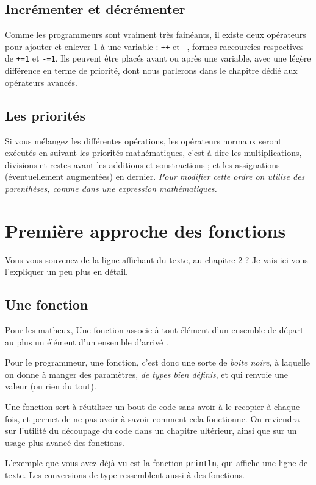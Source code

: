 \subsection{Incrémenter et décrémenter}
Comme les programmeurs sont vraiment très fainéants, il existe deux opérateurs pour ajouter et enlever 1 à une variable : \texttt{++} et \texttt{--}, formes raccourcies respectives de \texttt{+=1} et \texttt{-=1}. Ils peuvent être placés avant ou après une variable, avec une légère différence en terme de priorité, dont nous parlerons dans le chapitre dédié aux opérateurs avancés.

\subsection{Les priorités}
Si vous mélangez les différentes opérations, les opérateurs normaux seront exécutés en suivant les priorités mathématiques, c'est-à-dire les multiplications, divisions et restes avant les additions et soustractions ; et les assignations (éventuellement augmentées) en dernier.
\emph{Pour modifier cette ordre on utilise des parenthèses, comme dans une expression mathématiques.}

\pagebreak
\section{Première approche des fonctions}
Vous vous souvenez de la ligne affichant du texte, au chapitre 2 ? Je vais ici vous l'expliquer un peu plus en détail.

\subsection{Une fonction}
Pour les matheux, \og Une fonction associe à tout élément d'un ensemble de départ au plus un élément d'un ensemble d'arrivé \fg{}.

Pour le programmeur, une fonction, c'est donc une sorte de \emph{boite noire}, à laquelle on donne à manger des paramètres, \emph{de types bien définis}, et qui renvoie une valeur (ou rien du tout).

Une fonction sert à réutiliser un bout de code sans avoir à le recopier à chaque fois, et permet de ne pas avoir à savoir comment cela fonctionne.
On reviendra sur l'utilité du découpage du code dans un chapitre ultérieur,
ainsi que sur un usage plus avancé des fonctions.

L'exemple que vous avez déjà vu est la fonction \texttt{println}, qui affiche une ligne de texte. Les conversions de type ressemblent aussi à des fonctions.

